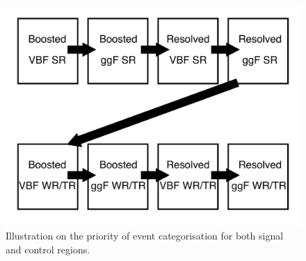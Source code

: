 \begin{figure}[h]
	\centering
	\includegraphics[width=0.7\hsize]{Chapter3/order}
	\caption{Illustration on the priority of event categorisation for both signal and control regions.}
	\label{Fig:order}
\end{figure}

